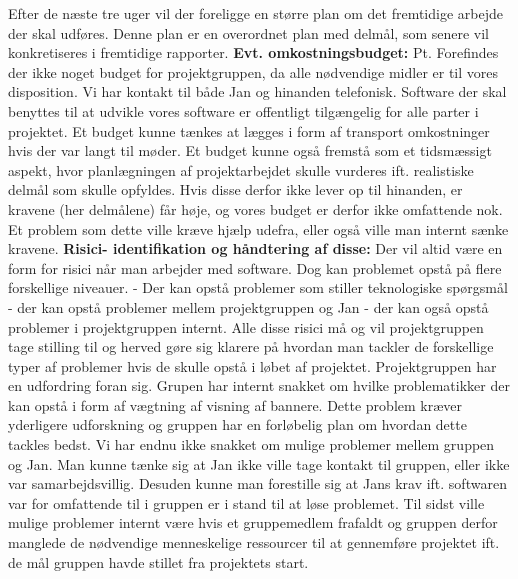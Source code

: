 \documentclass[a4paper,12pt]{article}
\begin{document}
Efter de næste tre uger vil der foreligge en større plan om det fremtidige arbejde der skal udføres. Denne plan er en overordnet plan med delmål, som senere vil konkretiseres i fremtidige rapporter.
\newline
\newline
\textbf{Evt. omkostningsbudget:}
\newline
Pt. Forefindes der ikke noget budget for projektgruppen, da alle nødvendige midler er til vores disposition. Vi har kontakt til både Jan og hinanden telefonisk.
Software der skal benyttes til at udvikle vores software er offentligt tilgængelig for alle parter i projektet.
Et budget kunne tænkes at lægges i  form af transport omkostninger hvis der var langt til møder.
Et budget kunne også fremstå som et tidsmæssigt aspekt, hvor planlægningen af projektarbejdet skulle vurderes ift. realistiske delmål som skulle opfyldes. Hvis disse derfor ikke lever op til hinanden, er kravene (her delmålene) får høje, og vores budget er derfor ikke omfattende nok. Et problem som dette ville kræve hjælp udefra, eller også ville man internt sænke kravene.
\newline
\newline
\textbf{Risici- identifikation og håndtering af disse:}
\newline
Der vil altid være en form for risici når man arbejder med software. Dog kan problemet opstå på flere forskellige niveauer.
\newline 
 - Der kan opstå problemer som stiller teknologiske spørgsmål
 \newline
- der kan opstå problemer mellem projektgruppen og Jan
\newline
- der kan også opstå problemer i projektgruppen internt.
\newline 
Alle disse risici må og vil projektgruppen tage stilling til og herved gøre sig klarere på hvordan man tackler de forskellige typer af problemer hvis de skulle opstå i løbet af projektet.
Projektgruppen har en udfordring foran sig. Grupen har internt snakket om hvilke problematikker der kan opstå i form af vægtning af visning af bannere. Dette problem kræver yderligere udforskning og gruppen har en forløbelig plan om hvordan dette tackles bedst. 
Vi har endnu ikke snakket om mulige problemer mellem gruppen og Jan. Man kunne tænke sig at Jan ikke ville tage kontakt til gruppen, eller ikke var samarbejdsvillig. Desuden kunne man forestille sig at Jans krav ift. softwaren var for omfattende til i gruppen er i stand til at løse problemet.
Til sidst ville mulige problemer internt være hvis et gruppemedlem frafaldt og gruppen derfor manglede de nødvendige menneskelige ressourcer til at gennemføre projektet ift. de mål gruppen havde stillet fra projektets start.
\end{document}

